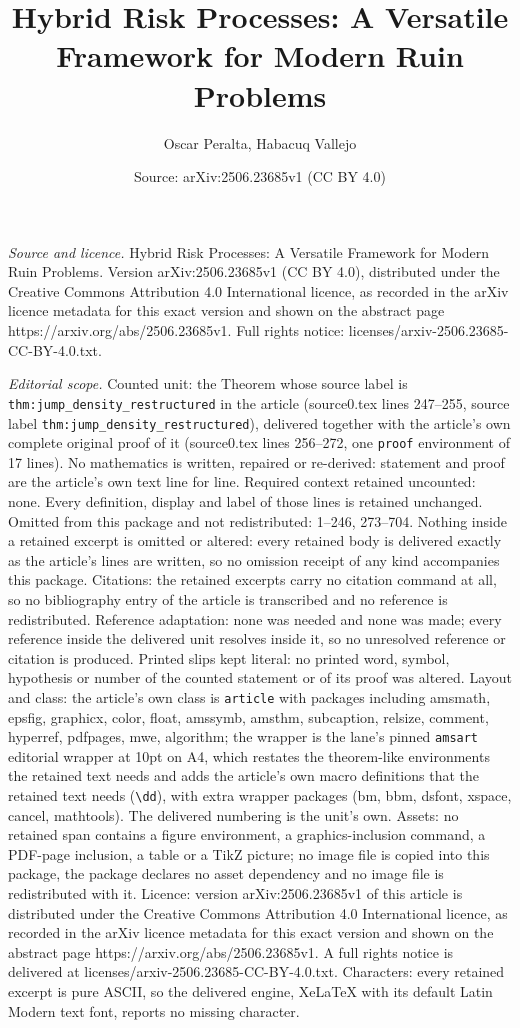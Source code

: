 \documentclass[10pt,a4paper]{amsart}
\title[Hybrid Risk Processes: A Versatile Framework for Modern Ruin]{Hybrid Risk Processes: A Versatile Framework for Modern Ruin Problems}
\author{Oscar Peralta, Habacuq Vallejo}
\date{Source: arXiv:2506.23685v1 (CC BY 4.0)}
\begin{document}
\maketitle

\noindent\emph{Source and licence.} Hybrid Risk Processes: A Versatile Framework for Modern Ruin Problems. Version arXiv:2506.23685v1 (CC BY 4.0), distributed under the Creative Commons Attribution 4.0 International licence, as recorded in the arXiv licence metadata for this exact version and shown on the abstract page https://arxiv.org/abs/2506.23685v1. Full rights notice: licenses/arxiv-2506.23685-CC-BY-4.0.txt.\par\smallskip

\noindent\textit{Editorial scope.} Counted unit: the Theorem whose source label is \texttt{thm:jump\_density\_restructured} in the article (source0.tex lines 247--255, source label \texttt{thm:jump\_density\_restructured}), delivered together with the article's own complete original proof of it (source0.tex lines 256--272, one \texttt{proof} environment of 17 lines). No mathematics is written, repaired or re-derived: statement and proof are the article's own text line for line. Required context retained uncounted: none. Every definition, display and label of those lines is retained unchanged. Omitted from this package and not redistributed: 1--246, 273--704. Nothing inside a retained excerpt is omitted or altered: every retained body is delivered exactly as the article's lines are written, so no omission receipt of any kind accompanies this package. Citations: the retained excerpts carry no citation command at all, so no bibliography entry of the article is transcribed and no reference is redistributed. Reference adaptation: none was needed and none was made; every reference inside the delivered unit resolves inside it, so no unresolved reference or citation is produced. Printed slips kept literal: no printed word, symbol, hypothesis or number of the counted statement or of its proof was altered. Layout and class: the article's own class is \texttt{article} with packages including amsmath, epsfig, graphicx, color, float, amssymb, amsthm, subcaption, relsize, comment, hyperref, pdfpages, mwe, algorithm; the wrapper is the lane's pinned \texttt{amsart} editorial wrapper at 10pt on A4, which restates the theorem-like environments the retained text needs and adds the article's own macro definitions that the retained text needs (\texttt{\textbackslash dd}), with extra wrapper packages (bm, bbm, dsfont, xspace, cancel, mathtools). The delivered numbering is the unit's own. Assets: no retained span contains a figure environment, a graphics-inclusion command, a PDF-page inclusion, a table or a TikZ picture; no image file is copied into this package, the package declares no asset dependency and no image file is redistributed with it. Licence: version arXiv:2506.23685v1 of this article is distributed under the Creative Commons Attribution 4.0 International licence, as recorded in the arXiv licence metadata for this exact version and shown on the abstract page https://arxiv.org/abs/2506.23685v1. A full rights notice is delivered at licenses/arxiv-2506.23685-CC-BY-4.0.txt. Characters: every retained excerpt is pure ASCII, so the delivered engine, XeLaTeX with its default Latin Modern text font, reports no missing character.
\end{document}
